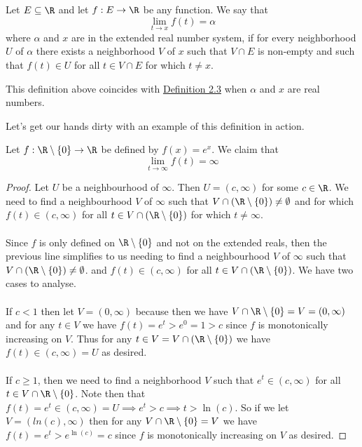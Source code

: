 	 
	 \begin{definition}
	 	Let $E \subseteq \R$ and let $f : E \to \R$ be any function. We say that $$\lim_{t \to x}f(t) = \alpha$$ where $\alpha$ and $x$ are in the extended real number system, if for every neighborhood $U$ of $\alpha$ there exists a neighborhood $V$ of $x$ such that $V \cap E$ is non-empty and such that $f(t) \in U$ for all $t \in V \cap E$ for which $t \neq x$.
	 \end{definition}
	 
	 
	 \begin{remark}
	 	This definition above coincides with \hyperlink{limit-function-defn}{Definition 2.3} when $\alpha$ and $x$ are real numbers.
	 \end{remark}
	 
	 Let's get our hands dirty with an example of this definition in action.
	 
	 \begin{example}
	 	Let $f : \R \setminus \{0\} \to \R$ be defined by $f(x) = e^x$. We claim that $$\lim_{t \to \infty} f(t) = \infty$$
	 \end{example}
	 
	 \begin{proof}
	 	Let $U$ be a neighbourhood of $\infty$. Then $U = (c, \infty)$ for some $c \in \R$. We need to find a neighbourhood $V$ of $\infty$ such that $V \cap\left(  \R \setminus \{0\}\right) \neq \emptyset $ and for which $f(t) \in (c, \infty)$ for all $t \in V \cap\left(  \R \setminus \{0\}\right) $ for which $t \neq \infty$. \\ \\
	 	Since $f$ is only defined on $\R \setminus \{0\}$ and not on the extended reals, then the  previous line simplifies to us needing to find a neighbourhood $V$ of $\infty$ such that $V \cap\left(  \R \setminus \{0\}\right) \neq \emptyset $. and $f(t) \in (c, \infty)$ for all $t \in V \cap\left(  \R \setminus \{0\}\right) $.  We have two cases to analyse.\\ \\
	 	If $c < 1$ then let $V = (0, \infty)$ because then we have $V \cap \R \setminus \{0\} = V = (0, \infty)$ and for any $t \in V$ we have $f(t) = e^t > e^0 = 1 > c$ since $f$ is monotonically increasing on $V$. Thus for any $t \in V = V \cap\left(  \R \setminus \{0\}\right)$ we have $f(t) \in (c, \infty) = U$ as desired. \\ \\
	 	If $ c \geq 1$, then we need to find a neighborhood $V$ such that $e^t \in (c, \infty)$ for all $t \in V \cap \R \setminus \{0\}$. Note then that $f(t) = e^t \in (c, \infty) = U \implies e^t > c \implies t > \ln(c)$. So if we let $V = (ln(c), \infty)$ then for any $V \cap \R \setminus \{0\} = V$ we have $f(t) = e^t > e^{\ln(c)} = c$ since $f$ is monotonically increasing on $V$ as desired.
	 \end{proof}
	 
